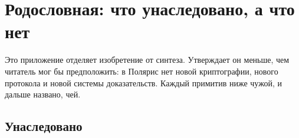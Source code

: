 \section{Родословная: что унаследовано, а что нет}
\label{sec:lineage}

Это приложение отделяет изобретение от синтеза. Утверждает он меньше, чем читатель мог бы предположить: в Полярис нет
новой криптографии, нового протокола и новой системы доказательств. Каждый примитив ниже чужой, и
дальше названо, чей.

\subsection{Унаследовано}

